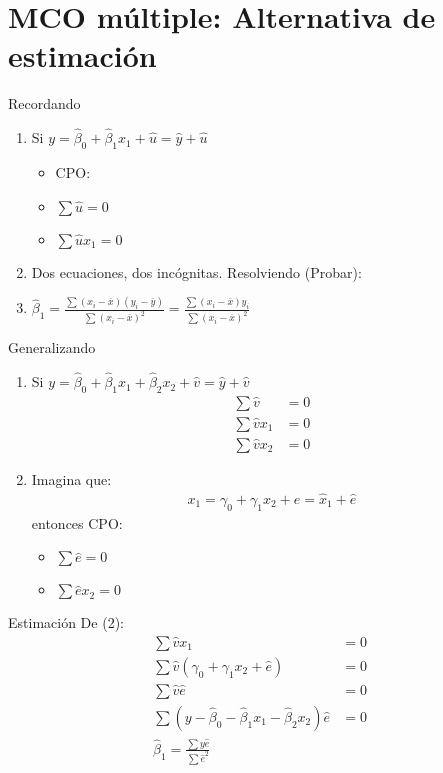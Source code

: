 \section[Estimación alternativa]{MCO múltiple: Alternativa de estimación}
\begin{frame}{Recordando}
	\begin{enumerate}
		\item Si $y=\hat\beta_0+\hat\beta_1 x_1+\hat u=\hat y+\hat u$
		\begin{itemize}
			\item CPO:
			\item $\sum \hat u=0$
			\item $\sum \hat u x_1=0$
		\end{itemize}
		\item Dos ecuaciones, dos incógnitas. Resolviendo (Probar):
		\item $\hat{\beta}_1=\frac{\sum(x_i-\overline{x})(y_i-\overline y)}{\sum(x_i-\overline x)^2}=\frac{\sum(x_i-\overline x)y_i}{\sum(x_i-\overline x)^2}$
	\end{enumerate}
\end{frame}
\begin{frame}{Generalizando}
	\begin{enumerate}
		\item Si $y=\hat\beta_0+\hat\beta_1 x_1+\hat\beta_2 x_2+\hat v=\hat y+\hat v$
		\begin{align}
			\sum \hat v & = 0 \\
			\sum \hat v x_1 & = 0 \\
			\sum \hat v x_2 & = 0
		\end{align}
		\item Imagina que:
		\begin{align}
			x_1 = \gamma_0+\gamma_1 x_2+\hat e=\hat{x}_1+\hat e
		\end{align}
		entonces CPO:
		\begin{itemize}
			\item $\sum \hat e=0$
			\item $\sum \hat e x_2=0$
		\end{itemize}
	\end{enumerate}
\end{frame}
\begin{frame}{Estimación} De (2):
	\begin{align}
		\sum\hat v x_1 & = 0 \\
		\sum\hat v (\gamma_0+\gamma_1 x_2+\hat e) & = 0 \\
		\sum\hat v \hat e & = 0 \\
		\sum (y-\hat\beta_0-\hat\beta_1 x_1-\hat\beta_2 x_2) \hat e & = 0\\
		\hat{\beta}_1=\frac{\sum y \hat e}{\sum \hat{e}^2}
	\end{align}
\end{frame}
